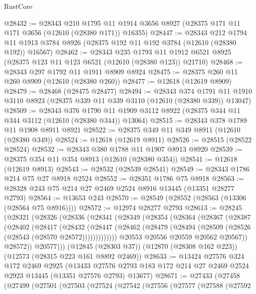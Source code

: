 \begin{lexlean}{RustCore}
\begin{coremodule}
@28432 := @28343
    @210
    @1795
    @11
    @1914
    @3656
    @8927
    (@28375 @171 @11 @171 @3656 (@12610 (@28380 @171)) @16355)
@28447 := @28343
    @212
    @1794
    @11
    @1913
    @3784
    @8926
    (@28375 @192 @11 @192 @3784 (@12610 (@28380 @192)) @16567)
@28462 := @28343
    @235
    @1793
    @11
    @1912
    @6521
    @8925
    (@28375 @123 @11 @123 @6521 (@12610 (@28380 @123)) @21710)
@28468 := @28343 @297 @1792 @11 @1911 @8909 @8924
@28475 := @28375 @260 @11 @260 @8909 (@12610 (@28380 @260))
@28477 := @12618 (@12619 @8909)
@28479 := @28468 (@28475 @28477)
@28494 := @28343
    @374
    @1791
    @11
    @1910
    @3110
    @8923
    (@28375 @339 @11 @339 @3110 (@12610 (@28380 @339)) @13047)
@28509 := @28343
    @376
    @1790
    @11
    @1909
    @3112
    @8922
    (@28375 @344 @11 @344 @3112 (@12610 (@28380 @344)) @13064)
@28515 := @28343 @378 @1789 @11 @1908 @8911 @8921
@28522 := @28375 @349 @11 @349 @8911 (@12610 (@28380 @349))
@28524 := @12618 (@12619 @8911)
@28526 := @28515 (@28522 @28524)
@28532 := @28343 @380 @1788 @11 @1907 @8913 @8920
@28539 := @28375 @354 @11 @354 @8913 (@12610 (@28380 @354))
@28541 := @12618 (@12619 @8913)
@28543 := @28532 (@28539 @28541)
@28549 := @28343 @1786 @214 @75 @27 @8918 @2524
@28552 := @28351 @1786 @75 @8918
@28563 := @28328 @243 @75 @214 @27 @2469 @2524 @8916 @13445 (@13351 @28277 @2793)
@28564 := @13653 @243
@28570 := @28549 (@28552 (@28563 (@13306 (@28564 @75 @8916))))
@28572 := @12974 @28277 @2793
@28613 := @28245
    (@28321
      (@28326
        (@28336
          (@28341
            (@28349
              (@28354
                (@28364
                  (@28367
                    (@28387
                      (@28402
                        (@28417
                          (@28432
                            (@28447
                              (@28462
                                (@28479 (@28494 (@28509 (@28526 (@28543 (@28570 @28572)))))))))))))
                  @20553
                  @20556
                  @20559
                  @20562
                  @20567))
              @28572))
          @20577)))
    (@12845 (@28303 @37))
    (@12870 (@28308 @162 @223))
    (@12573 (@28315 @223 @161 @8892 @2469))
@28633 := @13424
    @27576
    @324
    @172
    @2469
    @2925
    (@13433 @27576 @2793 @183 @172 @214 @27 @2469 @2524 @2923 @13445 (@13351 @27576 @2793) @13677)
@28671 := @27433
    (@27458
      (@27499
        (@27501
          (@27503
            (@27524
              (@27542
                (@27556
                  (@27577
                    (@27588
                      (@27592

\end{coremodule}
\end{lexlean}
